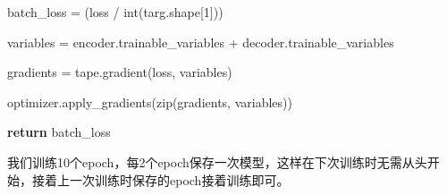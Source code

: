 \documentclass[
]{article}
\newenvironment{Shaded}{}{}
\newcommand{\BuiltInTok}[1]{#1}
\newcommand{\ControlFlowTok}[1]{\textcolor[rgb]{0.00,0.44,0.13}{\textbf{#1}}}
\newcommand{\DecValTok}[1]{\textcolor[rgb]{0.25,0.63,0.44}{#1}}
\newcommand{\NormalTok}[1]{#1}
\newcommand{\OperatorTok}[1]{\textcolor[rgb]{0.40,0.40,0.40}{#1}}
\begin{document}
\begin{Shaded}
\begin{Highlighting}[]
\NormalTok{    batch\_loss }\OperatorTok{=}\NormalTok{ (loss }\OperatorTok{/} \BuiltInTok{int}\NormalTok{(targ.shape[}\DecValTok{1}\NormalTok{]))}

\NormalTok{    variables }\OperatorTok{=}\NormalTok{ encoder.trainable\_variables }\OperatorTok{+}\NormalTok{ decoder.trainable\_variables}

\NormalTok{    gradients }\OperatorTok{=}\NormalTok{ tape.gradient(loss, variables)}

\NormalTok{    optimizer.apply\_gradients(}\BuiltInTok{zip}\NormalTok{(gradients, variables))}

    \ControlFlowTok{return}\NormalTok{ batch\_loss}

\end{Highlighting}
\end{Shaded}

我们训练10个epoch，每2个epoch保存一次模型，这样在下次训练时无需从头开始，接着上一次训练时保存的epoch接着训练即可。
\end{document}
